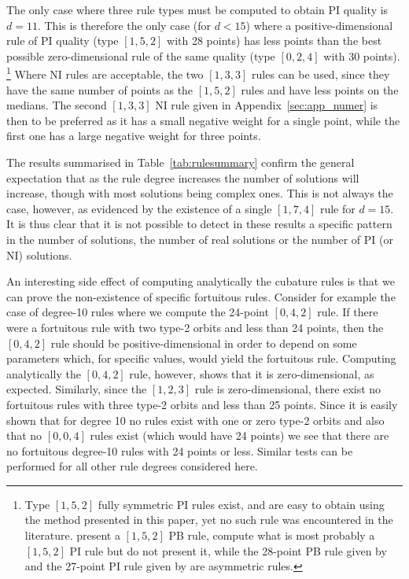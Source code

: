 \documentclass{article}
\begin{document}
The only case where three rule types must be computed to obtain PI quality is $d=11$. This is therefore the only case (for $d<15$) where a positive-dimensional rule of PI quality (type $[1,5,2]$ with 28 points) has less points than the best possible zero-dimensional rule of the same quality (type $[0,2,4]$ with 30 points).
\footnote{Type $[1,5,2]$ fully symmetric PI rules exist, and are easy to obtain using the method presented in this paper, yet no such rule was encountered in the literature. \citet{LynessJespersen1975} present a $[1,5,2]$ PB rule, \citet{WandzuraXiao2003} compute what is most probably a $[1,5,2]$ PI rule but do not present it, while the 28-point PB rule given by  and the 27-point PI rule given by \citet{Taylor2008} are asymmetric rules.}
Where NI rules are acceptable, the two $[1,3,3]$ rules can be used, since they have the same number of points as the $[1,5,2]$ rules and have less points on the medians. The second $[1,3,3]$ NI rule given in Appendix~\ref{sec:app_numer} is then to be preferred as it has a small negative weight for a single point, while the first one has a large negative weight for three points.

The results summarised in Table~\ref{tab:rulesummary} confirm the general expectation that as the rule degree increases the number of solutions will increase, though with most solutions being complex ones. This is not always the case, however, as evidenced by the existence of a single $[1,7,4]$ rule for $d=15$. It is thus clear that it is not possible to detect in these results a specific pattern in the number of solutions, the number of real solutions or the number of PI (or NI) solutions.



An interesting side effect of computing analytically the cubature rules is that we can prove the non-existence of specific fortuitous rules. Consider for example the case of degree-10 rules where we compute the 24-point $[0,4,2]$ rule. If there were a fortuitous rule with two type-2 orbits and less than 24 points, then the $[0,4,2]$ rule should be positive-dimensional in order to depend on some parameters which, for specific values, would yield the fortuitous rule. Computing analytically the $[0,4,2]$ rule, however, shows that it is zero-dimensional, as expected. Similarly, since the $[1,2,3]$ rule is zero-dimensional, there exist no fortuitous rules with three type-2 orbits and less than 25 points. Since it is easily shown that for degree 10 no rules exist with one or zero type-2 orbits and also that no $[0,0,4]$ rules exist (which would have 24 points) we see that there are no fortuitous degree-10 rules with 24 points or less. Similar tests can be performed for all other rule degrees considered here.
\end{document}
